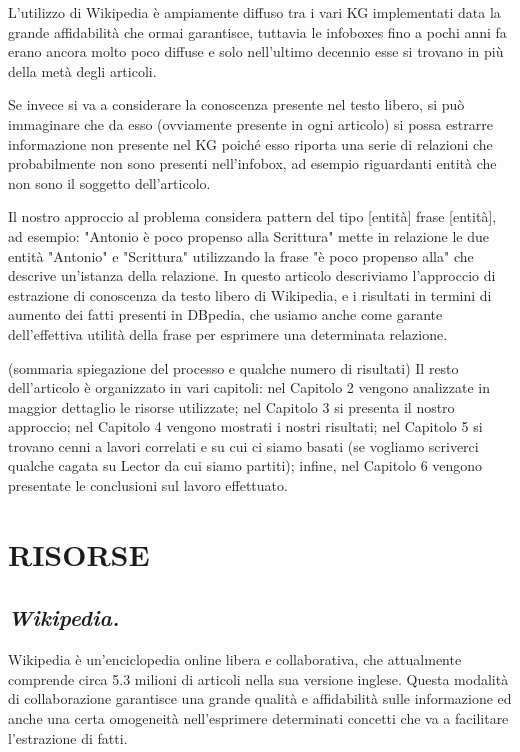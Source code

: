 \documentclass[10pt,a4paper,twocolumn]{article}
\begin{document}
L'utilizzo di Wikipedia è ampiamente diffuso tra i vari KG implementati data la grande affidabilità che ormai garantisce, tuttavia le infoboxes fino a pochi anni fa erano ancora molto poco diffuse e solo nell'ultimo decennio esse si trovano in più della metà degli articoli.

Se invece si va a considerare la conoscenza presente nel testo libero, si può immaginare che da esso (ovviamente presente in ogni articolo) si possa estrarre informazione non presente nel KG poiché esso riporta una serie di relazioni che probabilmente non sono presenti nell'infobox, ad esempio riguardanti entità che non sono il soggetto dell'articolo.

Il nostro approccio al problema considera pattern del tipo [entità] frase [entità], ad esempio: "Antonio è poco propenso alla Scrittura" mette in relazione le due entità "Antonio" e "Scrittura" utilizzando la frase "è poco propenso alla" che descrive un'istanza della relazione.
In questo articolo descriviamo l'approccio di estrazione di conoscenza da testo libero di Wikipedia, e i risultati in termini di aumento dei fatti presenti in DBpedia, che usiamo anche come garante dell'effettiva utilità della frase per esprimere una determinata relazione.

(sommaria spiegazione del processo e qualche numero di risultati)
Il resto dell'articolo è organizzato in vari capitoli: nel Capitolo 2 vengono analizzate in maggior dettaglio le risorse utilizzate; nel Capitolo 3 si presenta il nostro approccio; nel Capitolo 4 vengono mostrati i nostri risultati; nel Capitolo 5 si trovano cenni a lavori correlati e su cui ci siamo basati (se vogliamo scriverci qualche cagata su Lector da cui siamo partiti); infine, nel Capitolo 6 vengono presentate le conclusioni sul lavoro effettuato.

\section{RISORSE}
\subsection*{\textit{Wikipedia.}}

Wikipedia è un'enciclopedia online libera e collaborativa, che attualmente comprende circa 5.3 milioni di articoli nella sua versione inglese. Questa modalità di collaborazione garantisce una grande qualità e affidabilità sulle informazione ed anche una certa omogeneità nell'esprimere determinati concetti che va a facilitare l'estrazione di fatti.
 
\end{document}

